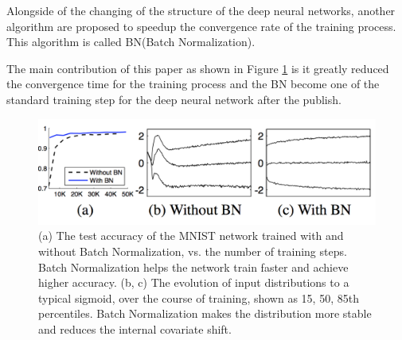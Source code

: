 \documentclass[a4paper,12pt]{article}
\begin{document}
Alongside of the changing of the structure of the deep neural networks, another algorithm are proposed to speedup the convergence rate of the training process. This algorithm is called BN(Batch Normalization)\cite{DBLP:journals/corr/IoffeS15}.

The main contribution of this paper as shown in Figure \ref{fig:bp} is it greatly reduced the convergence time for the training process and the BN become one of the standard training step for the deep neural network after the publish.\\
\begin{figure}[H]
  \begin{center}
      \includegraphics[scale=0.6]{bn.png}
\end{center}
\caption{(a) The test accuracy of the MNIST network trained with and without Batch Normalization, vs. the number of training steps. Batch Normalization helps the network train faster and achieve higher accuracy\cite{DBLP:journals/corr/IoffeS15}. (b, c) The evolution of input distributions to a typical sigmoid, over the course of training, shown as  15, 50, 85th percentiles. Batch Normalization makes the distribution more stable and reduces the internal covariate shift\cite{DBLP:journals/corr/IoffeS15}.}
 \label{fig:bp}
 \end{figure}




 
  
\end{document}
